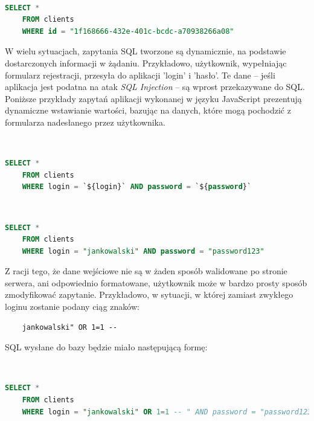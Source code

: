 \documentclass[12pt,twoside]{article}
\begin{document}
\

\begin{lstlisting}[language=SQL,caption=Zwrócenie rekordu o podanym identyfikatorze z tabeli 'clients',label={KodSQL1}]
	SELECT * 
	FROM clients
	WHERE id = "1f168666-432e-401c-bcdc-a70938266a08"
\end{lstlisting}

W wielu sytuacjach, zapytania SQL tworzone są dynamicznie, na podstawie dostarczonych informacji w żądaniu. Przykładowo, użytkownik, wypełniając formularz rejestracji, przesyła do aplikacji 'login' i 'hasło'. Te dane -- jeśli aplikacja jest podatna na atak \emph{SQL Injection} -- są wprost przekazywane do SQL. Poniższe przykłady zapytań aplikacji wykonanej w języku JavaScript prezentują dynamiczne wstawianie wartości, bazując na danych, które mogą pochodzić z formularza nadesłanego przez użytkownika.

\

\begin{lstlisting}[language=SQL,caption=Kod źródłowy zapytania z selekcją na podstawie danych od użytkownika,label={KodSQL2}]
	SELECT * 
	FROM clients
	WHERE login = `${login}` AND password = `${password}`
\end{lstlisting}

\

\begin{lstlisting}[language=SQL,caption=Zapytanie SQL po wprowadzeniu danych,label={KodSQL3}]
	SELECT * 
	FROM clients
	WHERE login = "jankowalski" AND password = "password123"
\end{lstlisting}

Z racji tego, że dane wejściowe nie są w żaden sposób walidowane po stronie serwera, ani odpowiednio formatowane, użytkownik może w bardzo prosty sposób zmodyfikować zapytanie. Przykładowo, w sytuacji, w której zamiast zwykłego loginu zostanie podany ciąg znaków: 

\begin{verbatim}
	jankowalski" OR 1=1 --
\end{verbatim}

SQL wysłane do bazy będzie miało następującą formę:

\

\begin{lstlisting}[language=SQL,caption=Zapytanie wysyłane do bazy po wprowadzeniu zmodyfikowanych danych,label={KodSQL4}]
	SELECT * 
	FROM clients
	WHERE login = "jankowalski" OR 1=1 -- " AND password = "password123"
\end{lstlisting}
\end{document}
